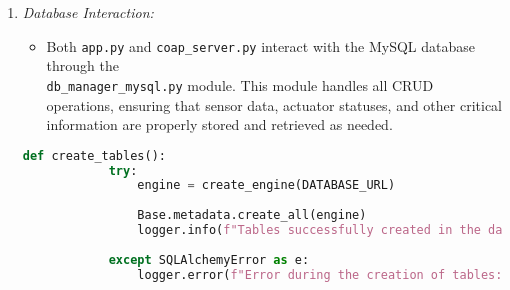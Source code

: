 \begin{enumerate}
    \item \textit{Database Interaction:}
          \begin{itemize}
              \item Both \texttt{app.py} and \texttt{coap\_server.py} interact with the MySQL database through the\\
                    \texttt{db\_manager\_mysql.py} module. This module handles all CRUD operations, ensuring that sensor data, actuator statuses, and other critical information are properly stored and retrieved as needed.
          \end{itemize}
          \begin{lstlisting}[language=Python]
        def create_tables():
            try:
                engine = create_engine(DATABASE_URL)
        
                Base.metadata.create_all(engine)
                logger.info(f"Tables successfully created in the database '{engine.url.database}'.")
        
            except SQLAlchemyError as e:
                logger.error(f"Error during the creation of tables: {str(e)}")
        \end{lstlisting}
\end{enumerate}

